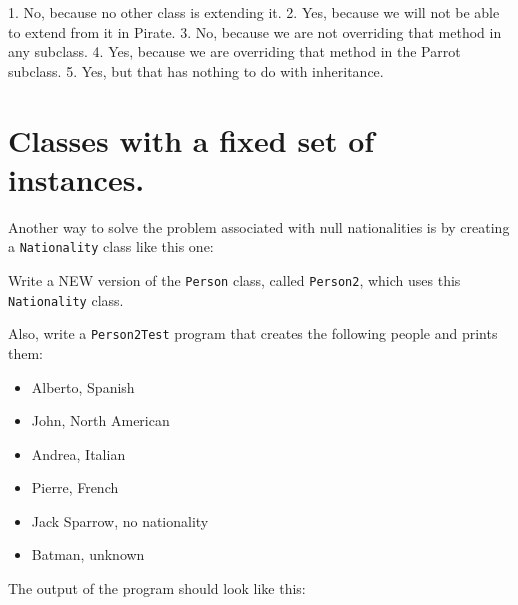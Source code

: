 \documentclass[a4paper, 11pt]{article}
\begin{document}
\begin{solution}
  1. No, because no other class is extending it.
  2. Yes, because we will not be able to extend from it in Pirate.
  3. No, because we are not overriding that method in any subclass.
  4. Yes, because we are overriding that method in the Parrot subclass.
  5. Yes, but that has nothing to do with inheritance.
\end{solution}













\section{Classes with a fixed set of instances.}

Another way to solve the problem associated with null nationalities is by
creating a \verb+Nationality+ class like this one:


Write a NEW version of the \verb+Person+ class, called \verb+Person2+, which
uses this \verb+Nationality+ class.

Also, write a \verb+Person2Test+ program that creates the following people and
prints them:

\begin{itemize}

  \item Alberto, Spanish

  \item John, North American

  \item Andrea, Italian

  \item Pierre, French

  \item Jack Sparrow, no nationality

  \item Batman, unknown

\end{itemize}

The output of the program should look like this:

\end{document}
